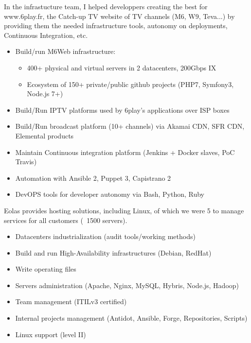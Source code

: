 \documentclass[12pt,a4paper,roman]{moderncv}          %
\begin{document}
{In the infrastucture team, I helped developpers creating the best for www.6play.fr, the Catch-up TV website of TV channels (M6, W9, Teva...) by providing them the needed infrastructure tools, autonomy on deployments, Continuous Integration, etc.
\begin{itemize}
  \item Build/run M6Web infrastructure:
  \begin{itemize}
    \item 400+ physical and virtual servers in 2 datacenters, 200Gbps IX
    \item Ecosystem of 150+ private/public github projects (PHP7, Symfony3, Node.js 7+)
  \end{itemize}
  \item Build/Run IPTV platforms used by 6play's applications over ISP boxes
  \item Build/Run broadcast platform (10+ channels) via Akamai CDN, SFR CDN, Elemental products
  \item Maintain Continuous integration platform (Jenkins + Docker slaves, PoC Travis)
  \item Automation with Ansible 2, Puppet 3, Capistrano 2
  \item DevOPS tools for developer autonomy via Bash, Python, Ruby
\end{itemize}}

{Eolas provides hosting solutions, including Linux, of which we were 5 to manage services for all customers (~1500 servers).
\begin{itemize}
  \item Datacenters industrialization (audit tools/working methods)
  \item Build and run High-Availability infrastructures (Debian, RedHat)
  \item Write operating files
  \item Servers administration (Apache, Nginx, MySQL, Hybris, Node.js, Hadoop)
  \item Team management (ITILv3 certified)
  \item Internal projects management (Antidot, Ansible, Forge, Repositories, Scripts)
  \item Linux support (level II)
\end{itemize}}
\end{document}

